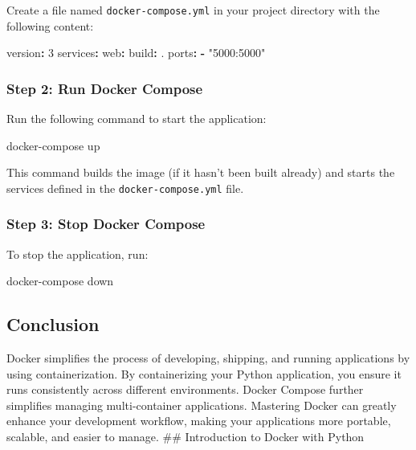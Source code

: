 \documentclass[
  letterpaper,
  DIV=11,
  numbers=noendperiod]{scrreprt}
\newenvironment{Shaded}{\begin{snugshade}}{\end{snugshade}}
\newcommand{\AttributeTok}[1]{\textcolor[rgb]{0.40,0.45,0.13}{#1}}
\newcommand{\ExtensionTok}[1]{\textcolor[rgb]{0.00,0.23,0.31}{#1}}
\newcommand{\FunctionTok}[1]{\textcolor[rgb]{0.28,0.35,0.67}{#1}}
\newcommand{\KeywordTok}[1]{\textcolor[rgb]{0.00,0.23,0.31}{\textbf{#1}}}
\newcommand{\NormalTok}[1]{\textcolor[rgb]{0.00,0.23,0.31}{#1}}
\newcommand{\StringTok}[1]{\textcolor[rgb]{0.13,0.47,0.30}{#1}}
\begin{document}
Create a file named \texttt{docker-compose.yml} in your project
directory with the following content:

\begin{Shaded}
\begin{Highlighting}[]
\FunctionTok{version}\KeywordTok{:}\AttributeTok{ }\StringTok{\textquotesingle{}3\textquotesingle{}}
\FunctionTok{services}\KeywordTok{:}
\AttributeTok{  }\FunctionTok{web}\KeywordTok{:}
\AttributeTok{    }\FunctionTok{build}\KeywordTok{:}\AttributeTok{ .}
\AttributeTok{    }\FunctionTok{ports}\KeywordTok{:}
\AttributeTok{      }\KeywordTok{{-}}\AttributeTok{ }\StringTok{"5000:5000"}
\end{Highlighting}
\end{Shaded}

\subsubsection{Step 2: Run Docker
Compose}\label{step-2-run-docker-compose}

Run the following command to start the application:

\begin{Shaded}
\begin{Highlighting}[]
\ExtensionTok{docker{-}compose}\NormalTok{ up}
\end{Highlighting}
\end{Shaded}

This command builds the image (if it hasn't been built already) and
starts the services defined in the \texttt{docker-compose.yml} file.

\subsubsection{Step 3: Stop Docker
Compose}\label{step-3-stop-docker-compose}

To stop the application, run:

\begin{Shaded}
\begin{Highlighting}[]
\ExtensionTok{docker{-}compose}\NormalTok{ down}
\end{Highlighting}
\end{Shaded}

\subsection{Conclusion}\label{conclusion-59}

Docker simplifies the process of developing, shipping, and running
applications by using containerization. By containerizing your Python
application, you ensure it runs consistently across different
environments. Docker Compose further simplifies managing multi-container
applications. Mastering Docker can greatly enhance your development
workflow, making your applications more portable, scalable, and easier
to manage. \#\# Introduction to Docker with Python
\end{document}
